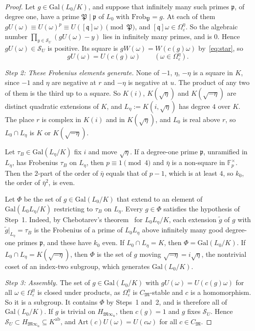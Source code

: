 \documentclass[11pt]{amsart}
\numberwithin{equation}{section}
\theoremstyle{plain}
\theoremstyle{definition}
\theoremstyle{remark}
\begin{document}
\begin{proof}
Let \(g\in\mathrm{Gal}(L_0/K)\), and suppose that infinitely many such primes \(\mathfrak p\), of degree one, have a prime \(\mathfrak P\mid\mathfrak p\) of \(L_0\) with \(\mathrm{Frob}_{\mathfrak P}=g\). At each of them \(gU(\omega)\equiv U(\omega)^p\equiv U([\mathfrak q]\omega)\pmod{\mathfrak P}\), and \([\mathfrak q]\omega\in\Omega^\eta_\varepsilon\). So the algebraic number \(\prod_{y\in\mathcal S_U}(gU(\omega)-y)\) lies in infinitely many primes, and is \(0\). Hence \(gU(\omega)\in\mathcal S_U\) is positive. Its square is \(gW(\omega)=W(c(g)\omega)\) by~\eqref{eq:star}, so
\[gU(\omega)=U(c(g)\,\omega)\qquad(\omega\in\Omega^\eta_\varepsilon).\]

\emph{Step 2: These Frobenius elements generate.} None of \(-1\), \(\eta\), \(-\eta\) is a square in \(K\), since \(-1\) and \(\eta\) are negative at \(r\) and \(-\eta\) is negative at \(u\). The product of any two of them is the third up to a square. So \(K(i)\), \(K(\sqrt\eta)\) and \(K(\sqrt{-\eta})\) are distinct quadratic extensions of \(K\), and \(L_\eta:=K(i,\sqrt\eta)\) has degree \(4\) over \(K\). The place \(r\) is complex in \(K(i)\) and in \(K(\sqrt\eta)\), and \(L_0\) is real above \(r\), so \(L_0\cap L_\eta\) is \(K\) or \(K(\sqrt{-\eta})\).

Let \(\tau_B\in\mathrm{Gal}(L_\eta/K)\) fix \(i\) and move \(\sqrt\eta\). If a degree-one prime \(\mathfrak p\), unramified in \(L_\eta\), has Frobenius \(\tau_B\) on \(L_\eta\), then \(p\equiv1\pmod4\) and \(\bar\eta\) is a non-square in \(\mathbb F_p^\times\). Then the \(2\)-part of the order of \(\bar\eta\) equals that of \(p-1\), which is at least \(4\), so \(k_0\), the order of \(\bar\eta^2\), is even.

Let \(\Phi\) be the set of \(g\in\mathrm{Gal}(L_0/K)\) that extend to an element of \(\mathrm{Gal}(L_0L_\eta/K)\) restricting to \(\tau_B\) on \(L_\eta\). Every \(g\in\Phi\) satisfies the hypothesis of Step~1. Indeed, by Chebotarev's theorem~\cite{Ch} for \(L_0L_\eta/K\), each extension \(\tilde g\) of \(g\) with \(\tilde g|_{L_\eta}=\tau_B\) is the Frobenius of a prime of \(L_0L_\eta\) above infinitely many good degree-one primes \(\mathfrak p\), and these have \(k_0\) even. If \(L_0\cap L_\eta=K\), then \(\Phi=\mathrm{Gal}(L_0/K)\). If \(L_0\cap L_\eta=K(\sqrt{-\eta})\), then \(\Phi\) is the set of \(g\) moving \(\sqrt{-\eta}=i\sqrt\eta\), the nontrivial coset of an index-two subgroup, which generates \(\mathrm{Gal}(L_0/K)\).

\emph{Step 3: Assembly.} The set of \(g\in\mathrm{Gal}(L_0/K)\) with \(gU(\omega)=U(c(g)\omega)\) for all \(\omega\in\Omega^\eta_\varepsilon\) is closed under products, as \(\Omega^\eta_\varepsilon\) is \(C_{\mathfrak M}\)-stable and \(c\) is a homomorphism. So it is a subgroup. It contains \(\Phi\) by Steps~1 and~2, and is therefore all of \(\mathrm{Gal}(L_0/K)\). If \(g\) is trivial on \(H_{\mathfrak M\infty_u}\), then \(c(g)=1\) and \(g\) fixes \(\mathcal S_U\). Hence \(\mathcal S_U\subset H_{\mathfrak M\infty_u}\subseteq K^{\mathrm{ab}}\), and \(\mathrm{Art}(c)U(\omega)=U(c\omega)\) for all \(c\in C_{\mathfrak M}\).


\end{proof}
\end{document}
